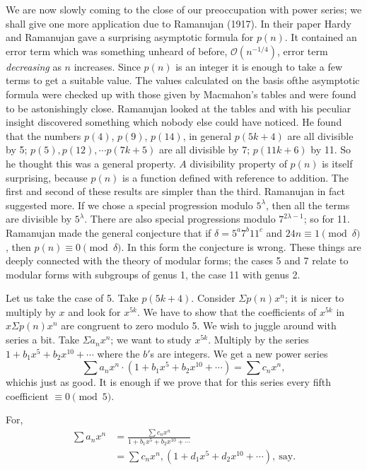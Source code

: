 We are now slowly coming to the close of our preoccupation with power
series; we shall give one more application due to Ramanujan (1917). In
their paper Hardy and Ramanujan gave a surprising asymptotic formula for
$p(n)$. It contained an error term which was something unheard of
before, $\mathcal{O}(n^{-1/4})$, error term \textit{decreasing} as $n$
increases. Since $p(n)$ is an integer it is enough to take a few terms
to get a suitable value. The values calculated on the basis of\pageoriginale  the
asymptotic formula were checked up with those given by Macmahon's
tables and were found to be astonishingly close. Ramanujan looked at
the tables and with his peculiar insight discovered something which
nobody else could have noticed. He found that the numbers $p(4)$,
$p(9)$, $p(14)$, in general $p(5k+4)$ are all divisible by 5; $p(5),
p(12), \cdots p (7k+5)$ are all divisible by 7; $p(11k +6)$ by 11. So
he thought this was a general property. $A$ divisibility property of
$p(n)$ is itself surprising, because $p(n)$ is a function defined with
reference to addition. The first and second of these results are
simpler than the third. Ramanujan in fact suggested more. If we chose
a special progression modulo $5^\lambda$, then all the terms are
divisible by $5^\lambda$. There are also special progressions modulo
$7^{2 \lambda-1}$; so for 11. Ramanujan made the general conjecture
that if $\delta = 5^a 7^b 11^c$ and $24n\equiv 1 \pmod{\delta}$, then
$p(n)\equiv 0 \pmod{\delta}$. In this form the conjecture is
wrong. These things are deeply connected with the theory of modular
forms; the cases 5 and 7 relate to modular forms with subgroups of
genus 1, the case 11 with genus 2.

Let us take the case of 5. Take $p(5k+4)$. Consider $\Sigma p(n) x^n$;
it is nicer to multiply by $x$ and look for $x^{5k}$. We have to show
that the coefficients of $x^{5k}$ in $x \Sigma p(n) x^n$ are congruent
to zero modulo 5. We wish to juggle around with series a bit. Take
$\Sigma a_n x^n$; we want to study $x^{5k}$. Multiply by the series
$1+b_1x^5 +b_2 x^{10}+ \cdots $ where the $b'$s are integers. We get a
new power series
$$
\sum a_n x^n \cdot(1+ b_1 x^5 + b_2 x^{10} + \cdots ) = \sum c_n x^n, 
$$  
which\pageoriginale   is just as good. It is enough if we prove that
for this series every fifth coefficient $\equiv 0 \pmod{5}$.

For, 
\begin{align*}
  \sum a_n x^n & = \frac{\sum c_nx^n}{1+b_1 x^5 + b_2 x^{10} +
    \cdots}\\
  & = \sum c_n x^n, (1+ d_1 x^5 + d_2 x^{10}+ \cdots ), ~\text{say}.
\end{align*}

